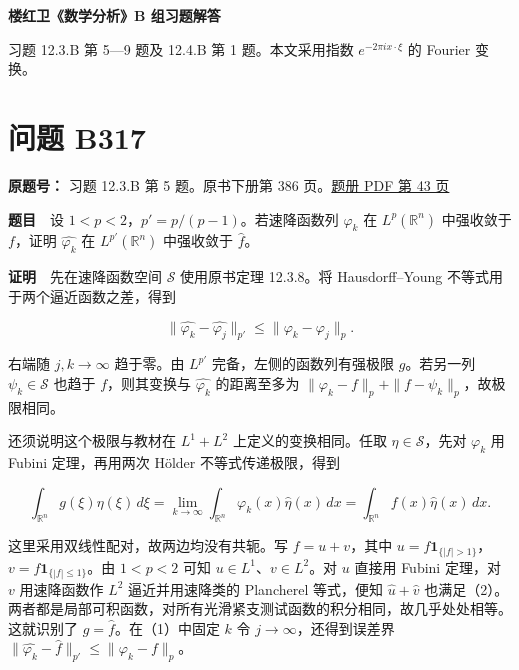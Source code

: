 \documentclass[11pt,a4paper]{article}
\begin{document}
\begin{center}
{\LARGE\bfseries 楼红卫《数学分析》B 组习题解答\par}
\vspace{7pt}{\large 第四十六批\quad B317—B322\par}
\vspace{5pt}{Fourier 变换的延拓与级数求和\par}
\end{center}
习题 12.3.B 第 5—9 题及 12.4.B 第 1 题。本文采用指数 \(e^{-2\pi i x\cdot\xi}\) 的 Fourier 变换。
\begingroup\setlength{\parskip}{0pt}\tableofcontents\endgroup

\section{问题 B317}\label{ux95eeux9898-b317}

\textbf{原题号：} 习题 12.3.B 第 5 题。原书下册第 386
页。\href{https://zj139.github.io/math-notes/files/problems/楼分析习题-v2.pdf\#page=43}{题册
PDF 第 43 页}

\textbf{题目}　设 \(1<p<2\)，\(p'=p/(p-1)\)。若速降函数列 \(\varphi_k\)
在 \(L^p(\mathbb R^n)\) 中强收敛于 \(f\)，证明 \(\widehat{\varphi_k}\)
在 \(L^{p'}(\mathbb R^n)\) 中强收敛于 \(\widehat f\)。

\textbf{证明}　先在速降函数空间 \(\mathcal S\) 使用原书定理 12.3.8。将
Hausdorff--Young 不等式用于两个逼近函数之差，得到

\begin{equation}
\|\widehat{\varphi_k}-\widehat{\varphi_j}\|_{p'}
\leq \|\varphi_k-\varphi_j\|_p .\tag{1}
\end{equation}

右端随 \(j,k\to\infty\) 趋于零。由 \(L^{p'}\) 完备，左侧的函数列有强极限
\(g\)。若另一列 \(\psi_k\in\mathcal S\) 也趋于 \(f\)，则其变换与
\(\widehat{\varphi_k}\) 的距离至多为
\(\|\varphi_k-f\|_p+\|f-\psi_k\|_p\)，故极限相同。

还须说明这个极限与教材在 \(L^1+L^2\) 上定义的变换相同。任取
\(\eta\in\mathcal S\)，先对 \(\varphi_k\) 用 Fubini 定理，再用两次
Hölder 不等式传递极限，得到

\begin{equation}
\int_{\mathbb R^n} g(\xi)\eta(\xi)\,d\xi
=\lim_{k\to\infty}\int_{\mathbb R^n}\varphi_k(x)\widehat\eta(x)\,dx
=\int_{\mathbb R^n} f(x)\widehat\eta(x)\,dx .\tag{2}
\end{equation}

这里采用双线性配对，故两边均没有共轭。写 \(f=u+v\)，其中
\(u=f\mathbf1_{\{|f|>1\}}\)，\(v=f\mathbf1_{\{|f|\le1\}}\)。由 \(1<p<2\)
可知 \(u\in L^1\)、\(v\in L^2\)。对 \(u\) 直接用 Fubini 定理，对 \(v\)
用速降函数作 \(L^2\) 逼近并用速降类的 Plancherel 等式，便知
\(\widehat u+\widehat v\)
也满足（2）。两者都是局部可积函数，对所有光滑紧支测试函数的积分相同，故几乎处处相等。这就识别了
\(g=\widehat f\)。在（1）中固定 \(k\) 令 \(j\to\infty\)，还得到误差界
\(\|\widehat{\varphi_k}-\widehat f\|_{p'}\leq\|\varphi_k-f\|_p\)。
\end{document}
